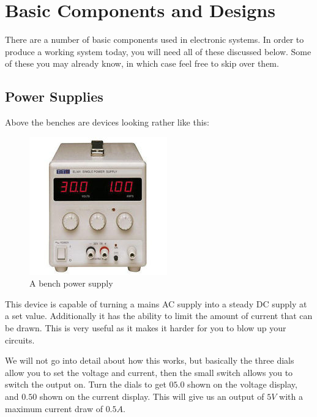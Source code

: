 \section{Basic Components and Designs}
There are a number of basic components used in electronic systems.
In order to produce a working system today, you will need all of these discussed below.
Some of these you may already know, in which case feel free to skip over them.

\subsection{Power Supplies}
Above the benches are devices looking rather like this:

\begin{figure}[H]
	\centering
	\includegraphics[width=\textwidth]{./images/bench.jpg}
	\caption{A bench power supply}
	\label{fig:benchsupply}
\end{figure}

This device is capable of turning a mains AC supply into a steady DC supply at a set value.
Additionally it has the ability to limit the amount of current that can be drawn.
This is very useful as it makes it harder for you to blow up your circuits.

We will not go into detail about how this works, but basically the three dials allow you to set the voltage and current, then the small switch allows you to switch the output on.
Turn the dials to get $05.0$ shown on the voltage display, and $0.50$ shown on the current display.
This will give us an output of $5V$ with a maximum current draw of $0.5A$.

